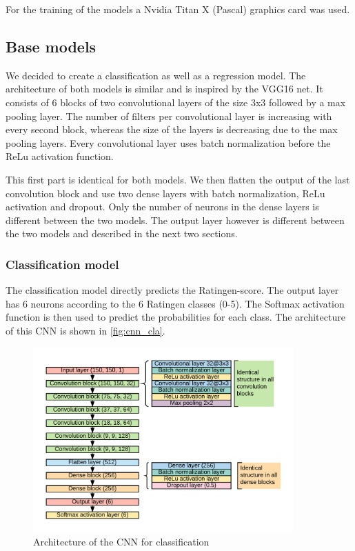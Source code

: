 \documentclass[12pt]{article}
\begin{document}
For the training of the models a Nvidia Titan X (Pascal) graphics card was used.

\subsection{Base models}

We decided to create a classification as well as a regression model. The architecture of both models is similar and is inspired by the VGG16 net. It consists of 6 blocks of two convolutional layers of the size 3x3 followed by a max pooling layer. The number of filters per convolutional layer is increasing with every second block, whereas the size of the layers is decreasing due to the max pooling layers. Every convolutional layer uses batch normalization before the ReLu activation function.

This first part is identical for both models. We then flatten the output of the last convolution block and use two dense layers with batch normalization, ReLu activation and dropout. Only the number of neurons in the dense layers is different between the two models. The output layer however is different between the two models and described in the next two sections.

\subsubsection{Classification model}
\label{subsubsec:clas}

The classification model directly predicts the Ratingen-score. The output layer has 6 neurons according to the 6 Ratingen classes (0-5). The Softmax activation function is then used to predict the probabilities for each class. The architecture of this CNN is shown in \autoref{fig:cnn_cla}.

\begin{figure}[ht]
\includegraphics[width=10cm]{cnn_classification}	
\caption{Architecture of the CNN for classification}
\label{fig:cnn_cla}
\end{figure}
\end{document}
